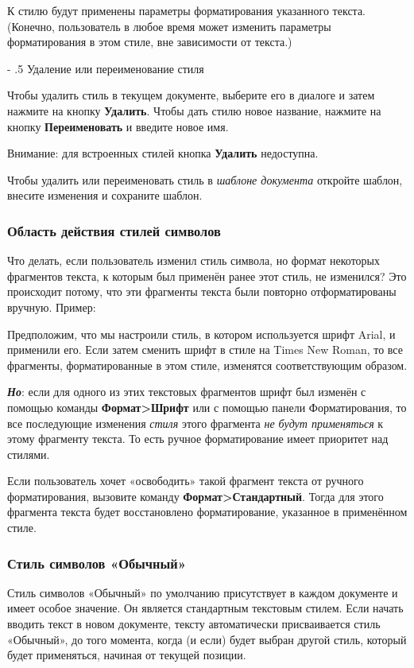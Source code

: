 \documentclass[a4paper,10pt]{article}
\makeatletter
\renewcommand\paragraph{%
   \@startsection{paragraph}{4}{0mm}%
      {-\baselineskip}%
      {.5\baselineskip}%
      {\normalfont\normalsize\bfseries}}
\makeatother
\begin{document}
К стилю будут применены параметры форматирования указанного текста. (Конечно, пользователь в любое время может изменить параметры форматирования в этом стиле, вне зависимости от текста.)

\paragraph{Удаление или переименование стиля}

Чтобы удалить стиль в текущем документе, выберите его в диалоге и затем нажмите на кнопку \textbf{Удалить}. Чтобы дать стилю новое название, нажмите на кнопку \textbf{Переименовать} и введите новое имя.

Внимание: для встроенных стилей кнопка \textbf{Удалить} недоступна.

Чтобы удалить или  переименовать стиль в \textit{шаблоне документа} откройте шаблон, внесите изменения и сохраните шаблон.

\subsubsection{Область действия стилей символов}
Что делать, если пользователь изменил стиль символа, но формат некоторых фрагментов текста, к которым был применён ранее этот стиль, не изменился? Это происходит потому, что эти фрагменты текста были повторно отформатированы вручную. Пример:

Предположим, что мы настроили стиль, в котором используется шрифт Arial, и применили его. Если затем сменить шрифт в стиле на Times New Roman, то все фрагменты, форматированные в этом стиле, изменятся соответствующим образом.

\textbf{\textit{Но}}: если для одного из этих текстовых фрагментов шрифт был изменён с помощью команды \textbf{Формат>Шрифт} или с помощью панели Форматирования, то все последующие изменения \textit{стиля} этого фрагмента \textit{не будут применяться} к этому фрагменту текста. То есть ручное форматирование имеет приоритет над стилями.

Если пользователь хочет «освободить» такой фрагмент текста от ручного форматирования, вызовите команду \textbf{Формат>Стандартный}. Тогда для этого фрагмента текста будет восстановлено форматирование, указанное в применённом стиле.

\subsubsection{Стиль символов «Обычный»}
Стиль символов «Обычный» по умолчанию присутствует в каждом документе и имеет особое значение. Он является стандартным текстовым стилем. Если начать вводить текст в новом документе, тексту автоматически присваивается стиль «Обычный», до того момента, когда (и если) будет выбран другой стиль, который будет применяться, начиная от текущей позиции.
\end{document}
